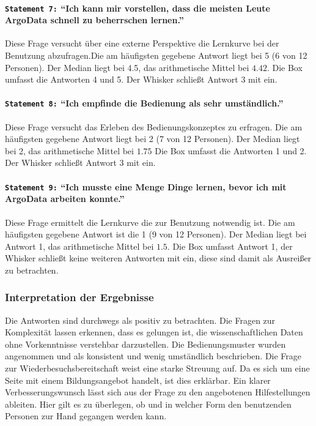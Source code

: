 \paragraph{\texttt{Statement 7:} "`Ich kann mir vorstellen, dass die meisten Leute ArgoData schnell zu beherrschen lernen."'}
    Diese Frage versucht über eine externe Perspektive die Lernkurve bei der Benutzung abzufragen.Die am häufigsten gegebene Antwort liegt bei 5 (6 von 12 Personen). Der Median liegt bei 4.5, das arithmetische Mittel bei $4.42$. Die Box umfasst die Antworten 4 und 5. Der Whisker schließt Antwort 3 mit ein.

\paragraph{\texttt{Statement 8:} "`Ich empfinde die Bedienung als sehr umständlich."'}
    Diese Frage versucht das Erleben des Bedienungskonzeptes zu erfragen. Die am häufigsten gegebene Antwort liegt bei 2 (7 von 12 Personen). Der Median liegt bei 2, das arithmetische Mittel bei $1.75$ Die Box umfasst die Antworten 1 und 2. Der Whisker schließt Antwort 3 mit ein.

\paragraph{\texttt{Statement 9:} "`Ich musste eine Menge Dinge lernen, bevor ich mit ArgoData arbeiten konnte."'}
    Diese Frage ermittelt die Lernkurve die zur Benutzung notwendig ist. Die am häufigsten gegebene Antwort ist die 1 (9 von 12 Personen). Der Median liegt bei Antwort 1, das arithmetische Mittel bei $1.5$. Die Box umfasst Antwort 1, der Whisker schließt keine weiteren Antworten mit ein, diese sind damit als Ausreißer zu betrachten.

\subsubsection{Interpretation der Ergebnisse}
Die Antworten sind durchwegs als positiv zu betrachten. Die Fragen zur Komplexität lassen erkennen, dass es gelungen ist, die wissenschaftlichen Daten ohne Vorkenntnisse verstehbar darzustellen. Die Bedienungsmuster wurden angenommen und als konsistent und wenig umständlich beschrieben. Die Frage zur Wiederbesuchsbereitschaft weist eine starke Streuung auf. Da es sich um eine Seite mit einem Bildungsangebot handelt, ist dies erklärbar.
Ein klarer Verbesserungswunsch lässt sich aus der Frage zu den angebotenen Hilfestellungen ableiten. Hier gilt es  zu überlegen, ob und in welcher Form den benutzenden Personen zur Hand gegangen werden kann.



